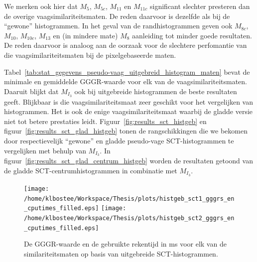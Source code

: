 We merken ook hier dat $M_5$, $M_{5c}$, $M_{11}$ en $M_{11c}$ significant slechter
presteren dan de overige vaagsimilariteitsmaten. De reden daarvoor is dezelfde als bij
de ``gewone'' histogrammen. In het geval van de randhistogrammen geven ook $M_{8c}$, $M_{10}$, 
$M_{10c}$, $M_{13}$ en (in mindere mate) $M_{8}$ aanleiding tot minder goede resultaten.
De reden daarvoor is analoog aan de oorzaak voor de slechtere perfomantie van die 
vaagsimilariteitsmaten bij de pixelgebaseerde maten.

Tabel~\ref{tab:stat_gegevens_pseudo-vaag_uitgebreid_histogram_maten} bevat de minimale
en gemiddelde GGGR-waarde voor elk van de vaagsimilariteitsmaten. Daaruit blijkt dat 
$M_{I_3}$ ook bij uitgebreide histogrammen de beste resultaten geeft. Blijkbaar
is die vaagsimilariteitsmaat zeer geschikt voor het vergelijken van histogrammen. Het
is ook de enige vaagsimilariteitsmaat waarbij de gladde versie niet tot betere 
prestaties leidt. Figuur~\ref{fig:results_sct_histgeb} en 
figuur~\ref{fig:results_sct_glad_histgeb} tonen de rangschikkingen die we bekomen
door respectievelijk ``gewone'' en gladde pseudo-vage SCT-histogrammen te vergelijken
met behulp van $M_{I_3}$. In figuur~\ref{fig:results_sct_glad_centrum_histgeb} worden 
de resultaten getoond van de gladde SCT-centrumhistogrammen in combinatie met $M_{I_3}$.

\begin{figure}[bp]
\centering
\texttt{[image: /home/klbostee/Workspace/Thesis/plots/histgeb\_sct1\_gggrs\_en\_cputimes\_filled.eps]} 
\texttt{[image: /home/klbostee/Workspace/Thesis/plots/histgeb\_sct2\_gggrs\_en\_cputimes\_filled.eps]}
\vspace{1pt}
\caption{\label{fig:histgeb_sct_gggrs_en_cputimes}De GGGR-waarde en de gebruikte rekentijd in ms voor elk 
van de similariteitsmaten op basis van uitgebreide SCT-histogrammen.}
\end{figure}

